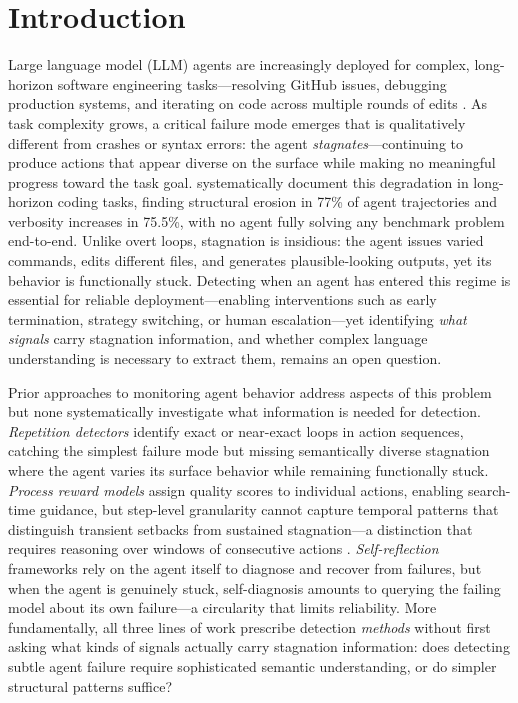 \section{Introduction}
\label{sec:introduction}

Large language model (LLM) agents are increasingly deployed for complex, long-horizon software engineering tasks---resolving GitHub issues, debugging production systems, and iterating on code across multiple rounds of edits \citep{jimenez2024swebench,yang2024sweagent,wang2025openhands}.
As task complexity grows, a critical failure mode emerges that is qualitatively different from crashes or syntax errors: the agent \emph{stagnates}---continuing to produce actions that appear diverse on the surface while making no meaningful progress toward the task goal.
\citet{orlanski2026slopcodebench} systematically document this degradation in long-horizon coding tasks, finding structural erosion in 77\% of agent trajectories and verbosity increases in 75.5\%, with no agent fully solving any benchmark problem end-to-end.
Unlike overt loops, stagnation is insidious: the agent issues varied commands, edits different files, and generates plausible-looking outputs, yet its behavior is functionally stuck.
Detecting when an agent has entered this regime is essential for reliable deployment---enabling interventions such as early termination, strategy switching, or human escalation---yet identifying \emph{what signals} carry stagnation information, and whether complex language understanding is necessary to extract them, remains an open question.

Prior approaches to monitoring agent behavior address aspects of this problem but none systematically investigate what information is needed for detection.
\emph{Repetition detectors} identify exact or near-exact loops in action sequences, catching the simplest failure mode but missing semantically diverse stagnation where the agent varies its surface behavior while remaining functionally stuck.
\emph{Process reward models} \citep{xi2025agentprm} assign quality scores to individual actions, enabling search-time guidance, but step-level granularity cannot capture temporal patterns that distinguish transient setbacks from sustained stagnation---a distinction that requires reasoning over windows of consecutive actions \citep{chen2025monitoring}.
\emph{Self-reflection} frameworks \citep{shinn2023reflexion,yao2023tot,zhou2024lats} rely on the agent itself to diagnose and recover from failures, but when the agent is genuinely stuck, self-diagnosis amounts to querying the failing model about its own failure---a circularity that limits reliability.
More fundamentally, all three lines of work prescribe detection \emph{methods} without first asking what kinds of signals actually carry stagnation information: does detecting subtle agent failure require sophisticated semantic understanding, or do simpler structural patterns suffice?


